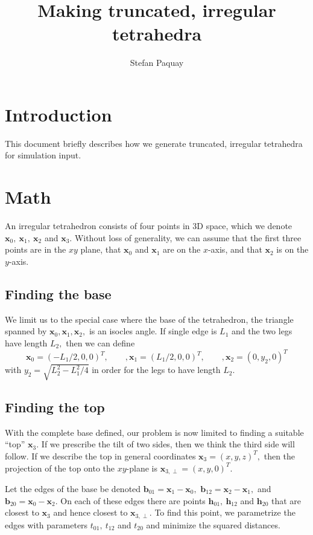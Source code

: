 \documentclass[10pt,a4paper]{article}
\title{ Making truncated, irregular tetrahedra }
\author{ Stefan Paquay }
\date{  }
\newcommand{\bvec}[1]{\mathbf{#1}}
\begin{document}
\maketitle

\section{Introduction}
This document briefly describes how we generate truncated, irregular tetrahedra for simulation input.

\section{Math}
An irregular tetrahedron consists of four points in 3D space, which we denote $\bvec{x}_0,~\bvec{x}_1,~\bvec{x}_2$ and $\bvec{x}_3.$
Without loss of generality, we can assume that the first three points are in the $xy$ plane, that $\bvec{x}_0$ and $\bvec{x}_1$ are on the $x$-axis, and that $\bvec{x}_2$ is on the $y$-axis.

\subsection{Finding the base}
We limit us to the special case where the base of the tetrahedron, the triangle spanned by $\bvec{x}_0, \bvec{x}_1, \bvec{x}_2,$ is an isocles angle.
If single edge is $L_1$ and the two legs have length $L_2,$ then we can define
\begin{equation*}
  \bvec{x}_0 = (-L_1/2, 0, 0)^T, \qquad, \bvec{x}_1 = (L_1/2, 0, 0)^T, \qquad, \bvec{x}_2 = (0, y_2, 0)^T
\end{equation*}
with $y_2 = \sqrt{L_2^2 - L_1^2/4}$ in order for the legs to have length $L_2.$

\subsection{Finding the top}
With the complete base defined, our problem is now limited to finding a suitable ``top'' $\bvec{x}_3.$
If we prescribe the tilt of two sides, then we think the third side will follow.
If we describe the top in general coordinates $\bvec{x}_3 = (x,y,z)^T,$ then the projection of the top onto the $xy$-plane is $\bvec{x}_{3,\perp} = (x,y,0)^T.$

Let the edges of the base be denoted $\bvec{b}_{01} = \bvec{x}_1 - \bvec{x}_0,$ $\bvec{b}_{12} = \bvec{x}_2 - \bvec{x}_1,$ and $\bvec{b}_{20} = \bvec{x}_0 - \bvec{x}_2.$ On each of these edges there are points $\bvec{h}_{01},~\bvec{h}_{12}$ and $\bvec{h}_{20}$ that are closest to $\bvec{x}_3$ and hence closest to $\bvec{x}_{3,\perp}.$
To find this point, we parametrize the edges with parameters $t_{01},~t_{12}$ and $t_{20}$ and minimize the squared distances.
\end{document}
